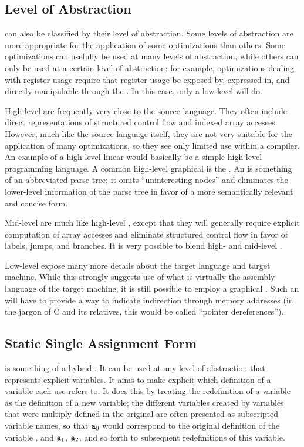 \subsection{Level of Abstraction}
\IRs can also be classified by their level of abstraction. Some levels of abstraction are more appropriate for the application of some optimizations than others. Some optimizations can usefully be used at many levels of abstraction, while others can only be used at a certain level of abstraction: for example, optimizations dealing with register usage require that register usage be exposed by, expressed in, and directly manipulable through the \IR{}. In this case, only a low-level \IR will do.

High-level \IRs are frequently very close to the source language. They often include direct representations of structured control flow and indexed array accesses. However, much like the source language itself, they are not very suitable for the application of many optimizations, so they see only limited use within a compiler. An example of a high-level linear \IR would basically be a simple high-level programming language. A common high-level graphical \IR is the . An \AST is something of an abbreviated parse tree; it omits ``uninteresting nodes'' and eliminates the lower-level information of the parse tree in favor of a more semantically relevant and concise form.%

Mid-level \IRs are much like high-level \IRs{}, except that they will generally require explicit computation of array accesses and eliminate structured control flow in favor of labels, jumps, and branches. It is very possible to blend high- and mid-level \IRs{}.

Low-level \IRs expose many more details about the target language and target machine. While this strongly suggests use of what is virtually the assembly language of the target machine, it is still possible to employ a graphical \IR{}. Such an \IR will have to provide a way to indicate indirection through memory addresses (in the jargon of C and its relatives, this would be called ``pointer dereferences'').

\subsection{Static Single Assignment Form}
 is something of a hybrid \IR. It can be used at any level of abstraction that represents explicit variables. It aims to make explicit which definition of a variable each use refers to. It does this by treating the redefinition of a variable as the definition of a new variable; the different variables created by variables that were multiply defined in the original \IR are often presented as subscripted variable names, so that $\texttt{a}_{0}$ would correspond to the original definition of the variable , and $\texttt{a}_{1}$, $\texttt{a}_{2}$, and so forth to subsequent redefinitions of this variable.

